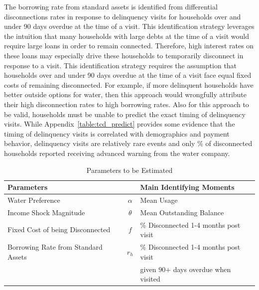 \documentclass[12pt]{article}
\begin{document}
The borrowing rate from standard assets is identified from differential disconnections rates in response to delinquency visits for households over and under 90 days overdue at the time of a visit.  This identification strategy leverages the intuition that many households with large debts at the time of a visit would require large loans in order to remain connected.  Therefore, high interest rates on these loans may especially drive these households to temporarily disconnect in response to a visit.  This identification strategy requires the assumption that households over and under 90 days overdue at the time of a visit face equal fixed costs of remaining disconnected.  For example, if more delinquent households have better outside options for water, then this approach would wrongfully attribute their high disconnection rates to high borrowing rates.  Also for this approach to be valid, households must be unable to predict the exact timing of delinquency visits.  While Appendix~\ref{table:tcd_predict} provides some evidence that the timing of delinquency visits is correlated with demographics and payment behavior, delinquency visits are relatively rare events and only \unskip\% of disconnected households reported receiving advanced warning from the water company.

\begin{table}[H]
\centering
\caption{Parameters to be Estimated}\label{table:estimparam}
\vspace{-2mm}
\begin{tabular}{l*{1}{cl}}
\toprule
Parameters  &   & Main Identifying Moments  \\
\midrule
Water Preference  & $\alpha$ & Mean Usage \\[.1em]
Income Shock Magnitude & $\theta$ & Mean Outstanding Balance  \\[.1em]
Fixed Cost of being Disconnected  & $f$ &  \% Disconnected 1-4 months post visit \\[.1em]
Borrowing Rate from Standard Assets & $r_h$ & \% Disconnected 1-4 months post visit \\
 & & given 90+ days overdue when visited \\
\bottomrule
\end{tabular}
\end{table}
\end{document}
